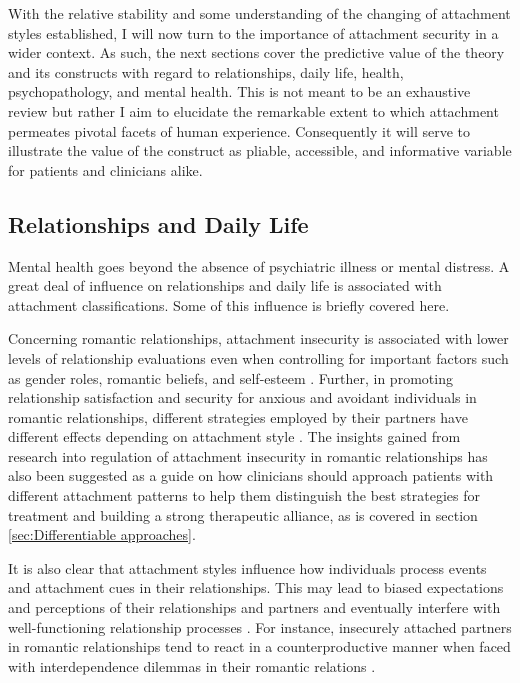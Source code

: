 \documentclass[12pt]{report}
\begin{document}
With the relative stability and some understanding of the changing of attachment styles established, I will now turn to the importance of attachment security in a wider context. As such, the next sections cover the predictive value of the theory and its constructs with regard to relationships, daily life, health, psychopathology, and mental health. This is not meant to be an exhaustive review but rather I aim to elucidate the remarkable extent to which attachment permeates pivotal facets of human experience. Consequently it will serve to illustrate the value of the construct as pliable, accessible, and informative variable for patients and clinicians alike.

\subsection{Relationships and Daily Life}
Mental health goes beyond the absence of psychiatric illness or mental distress. A great deal of influence on relationships and daily life is associated with attachment classifications. Some of this influence is briefly covered here.

Concerning romantic relationships, attachment insecurity is associated with lower levels of relationship evaluations even when controlling for important factors such as gender roles, romantic beliefs, and self-esteem \cite{Rodriguez2021, Jones1996}.
Further, in promoting relationship satisfaction and security for anxious and avoidant individuals in romantic relationships, different strategies employed by their partners have different effects depending on attachment style \cite{Overall2015}. The insights gained from research into regulation of attachment insecurity in romantic relationships has also been suggested as a guide on how clinicians should approach patients with different attachment patterns to help them distinguish the best strategies for treatment and building a strong therapeutic alliance, as is covered in section \ref{sec:Differentiable approaches}.

It is also clear that attachment styles influence how individuals process events and attachment cues in their relationships. This may lead to biased expectations and perceptions of their relationships and partners and eventually interfere with well-functioning relationship processes \cite{Collins2007, Collins2004, Hazan1994, Mikulincer2003, Rodriguez2019}.
For instance, insecurely attached partners in romantic relationships tend to react in a counterproductive manner when faced with interdependence dilemmas in their romantic relations \cite{Simpson2012}.
\end{document}
